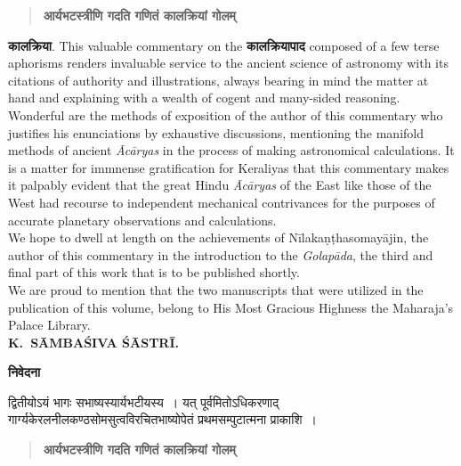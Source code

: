 \documentclass[11pt, openany]{book}
\begin{document}
\begin{quote}
\textbf{आर्यभटस्त्रीणि गदति गणितं कालक्रियां गोलम्}
\end{quote}
 \textbf{कालक्रिया}. {\en This valuable commentary on the} \textbf{कालक्रियापाद} {\en composed of a few terse aphorisms renders invaluable service to the ancient science of astronomy with its citations of authority and illustrations, always bearing in mind the matter at hand and explaining with a wealth of cogent and many-sided reasoning. Wonderful are the methods of exposition of the author of this commentary who justifies his enunciations by exhaustive discussions, mentioning the manifold methods of ancient \emph{Ācāryas} in the process of making astronomical calculations. It is a matter for immnense gratification for Keraliyas that this commentary makes it palpably evident that the great Hindu \emph{Ācāryas} of the East like those of the West had recourse to independent mechanical contrivances for the purposes of accurate planetary observations and calculations.\\

We hope to dwell at length on the achievements of Nīlakaṇṭhasomayājin, the author of this commentary in the introduction to the \emph{Golapāda}, the third and final part of this work that is to be published shortly.\\

We are proud to mention that the two manuscripts that were utilized in the publication of this volume, belong to His Most Gracious Highness the Maharaja's Palace Library.}\\

\hspace{5cm} \textbf{\en K.~SĀMBAŚIVA ŚĀSTRĪ.}

\newpage

\begin{center}
\textbf{निवेदना}
\end{center}



द्वितीयोऽयं भागः सभाष्यस्यार्यभटीयस्य~। यत् पूर्वमितोऽधिकरणाद् गार्ग्यकेरलनीलकण्ठसोमसुत्वविरचितभाष्योपेतं प्रथमसम्पुटात्मना प्राकाशि~।

\begin{quote}
\textbf{आर्यभटस्त्रीणि गदति गणितं कालक्रियां गोलम्}
\end{quote}
\end{document}
